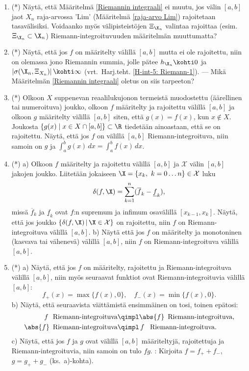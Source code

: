 \begin{enumerate}
\item (*) \label{H-int-5: tasavälinen jako}
Näytä, että Määritelmä \ref{Riemannin integraali} ei muutu, jos välin $[a,b]$ jaot $X_n$
raja-arvossa 'Lim' (Määritelmä \ref{raja-arvo Lim}) rajoitetaan tasavälisiksi. Voidaanko myös
välipisteistöjen $\Xi_{\X_n}$ valintaa rajoittaa (esim.\ $\Xi_{\X_n}\subset\X_n$)
Riemann-integroituvuuden määritelmän muuttumatta?

\item (*) \label{H-int-5: Riemann-2}
Näytä, että jos $f$ on määritelty välillä $[a,b]$ mutta ei ole rajoitettu, niin on olemassa
jono Riemannin summia, jolle pätee $h_{\X_n} \kohti 0$ ja
$\left|\sigma(\X_n,\Xi_{X_n})\right| \kohti \infty$ (vrt.\ Harj.teht. \ref{H-int-5: Riemann-1}).
--- Mikä Määritelmän \ref{Riemannin integraali} oletus on siis tarpeeton?

\item (*) \label{H-int-5: funktion poikkeutus}
Olkoon $X$ suppenevan reaalilukujonon termeistä muodostettu (äärellinen tai numeroituva) joukko,
olkoon $f$ määritelty ja rajoitettu välillä $[a,b]$ ja olkoon $g$ määritelty välillä $[a,b]$
siten, että $g(x)=f(x)$, kun $x \not\in X$. Joukosta $\{g(x) \mid x\in X\cap[a,b]\}\subset\R$ 
tiedetään ainoastaan, että se on rajoitettu. Näytä, että jos $f$ on välillä $[a,b]$ 
Riemann-integroituva, niin samoin on $g$ ja $\int_a^b g(x)\,dx=\int_a^b f(x)\,dx$.

\item (*) \label{H-int-5: monotonisuus ja integroituvuus}
a) Olkoon $f$ määritelty ja rajoitettu välillä $[a,b]$ ja $\mathcal{X}$ välin $[a,b]$ jakojen
joukko. Liitetään jokaiseen $\X = \{x_k,\ k = 0 \ldots n\} \in \mathcal{X}$ luku
\[
\delta(f,\X)=\sum_{k=1}^n (\overline{f}_k-\underline{f}_k),
\]
missä $\overline{f}_k$ ja $\underline{f}_k$ ovat $f$:n supremum ja infimum osavälillä 
$[x_{k-1},x_k]$. Näytä, että jos joukko $\{\delta(f,\X)\,|\,\X \in \mathcal{X}\}$ on 
rajoitettu, niin $f$ on Riemann-integroituva välillä $[a,b]$. \vspace{1mm}\newline
b) Näytä  että jos $f$ on määritelty ja monotoninen (kasvava tai vähenevä) välillä $[a,b]$, niin
$f$ on Riemann-integroituva välillä $[a,b]$.

\item (*) \label{H-int-5: itseisarvon ja tulon integroituvuus}
a) Näytä, että jos $f$ on määritelty, rajoitettu ja Riemann-integroituva välillä $[a,b]$, niin
myös seuraavat funktiot ovat Riemann-integroituvia välillä $[a,b]$:
\[
f_+(x)=\max\{f(x),0\}, \quad f_-(x)=\min\{f(x),0\}.
\]
b) Näytä, että seuraavista väittämistä ensimmäinen on tosi, toinen epätosi:
\begin{align*}
f\ \ \text{Riemann-integroituva}       &\qimpl \abs{f}\,\ \text{Riemann-integroituva}, \\
\abs{f}\,\ \text{Riemann-integroituva} &\qimpl \,f\,\ \ \text{Riemann-integroituva}.
\end{align*}
c) Näytä, että jos $f$ ja $g$ ovat välillä $[a,b]$ määriteltyjä, rajoitettuja ja
Riemann-integroituvia, niin samoin on tulo $fg$. : Kirjoita $f=f_++f_-$,
$g=g_++g_-$ (ks.\ a)-kohta).

\end{enumerate}